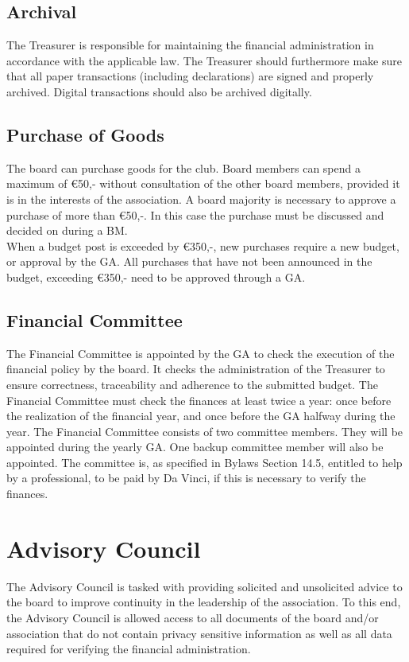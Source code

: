 \documentclass[a4paper]{article}
\newcommand{\Asta}{Bylaws} %
\begin{document}
\subsection{Archival}
The Treasurer is responsible for maintaining the financial administration in accordance with the applicable law. The Treasurer should furthermore make sure that all paper transactions (including declarations) are signed and properly archived. Digital transactions should also be archived digitally.

\subsection{Purchase of Goods}
The board can purchase goods for the club. Board members can spend a maximum of €50,- without consultation of the other board members, provided it is in the interests of the association. A board majority is necessary to approve a purchase of more than €50,-. In this case the purchase must be discussed and decided on during a { BM}. \\

When a budget post is exceeded by €350,-, new purchases require a new budget, or approval by the { GA}. All purchases that have not been announced in the budget, exceeding €350,- need to be approved through a { GA}.

\subsection{Financial Committee}
The Financial Committee is appointed by the { GA} to check the execution of the financial policy by the board. It checks the administration of the Treasurer to ensure correctness, traceability and adherence to the submitted budget. The Financial Committee must check the finances at least twice a year: once before the realization of the financial year, and once before the { GA} halfway during the year. The Financial Committee consists of two committee members. They will be appointed during the yearly { GA}. One backup committee member will also be appointed. The committee is, as specified in { \Asta} Section 14.5, entitled to help by a professional, to be paid by Da Vinci, if this is necessary to verify the finances.

\section{Advisory Council}
The Advisory Council is tasked with providing solicited and unsolicited advice to the board to improve continuity in the leadership of the association. To this end, the Advisory Council is allowed access to all documents of the board and/or association that do not contain privacy sensitive information as well as all data required for verifying the financial administration. \\
\end{document}
